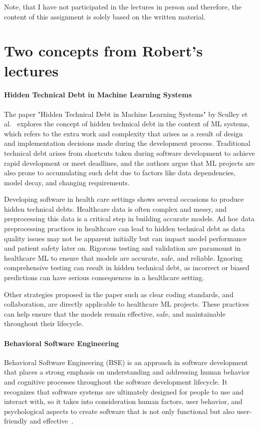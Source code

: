 \documentclass[11pt,runningheads]{article}
\begin{document}
Note, that I have not participated in the lectures in person and therefore, the content of this assignment is solely based on the written material. 

\section{Two concepts from Robert's lectures}
\paragraph{Hidden Technical Debt in Machine Learning Systems}
The paper "Hidden Technical Debt in Machine Learning Systems" by Sculley et al.~\cite{sculley2015hidden} explores the concept of hidden technical debt in the context of ML systems, which refers to the extra work and complexity that arises as a result of design and implementation decisions made during the development process. 
Traditional technical debt arises from shortcuts taken during software development to achieve rapid development or meet deadlines, and the authors argue that ML projects are also prone to accumulating such debt due to factors like data dependencies, model decay, and changing requirements. 

Developing software in health care settings shows several occasions to produce hidden technical debts. 
Healthcare data is often complex and messy, and preprocessing this data is a critical step in building accurate models. Ad hoc data preprocessing practices in healthcare can lead to hidden technical debt as data quality issues may not be apparent initially but can impact model performance and patient safety later on. Rigorous testing and validation are paramount in healthcare ML to ensure that models are accurate, safe, and reliable. Ignoring comprehensive testing can result in hidden technical debt, as incorrect or biased predictions can have serious consequences in a healthcare setting.

Other strategies proposed in the paper such as clear coding standards, and collaboration, are directly applicable to healthcare ML projects. These practices can help ensure that the models remain effective, safe, and maintainable throughout their lifecycle.

\paragraph{Behavioral Software Engineering}
Behavioral Software Engineering (BSE) is an approach in software development that places a strong emphasis on understanding and addressing human behavior and cognitive processes throughout the software development lifecycle. It recognizes that software systems are ultimately designed for people to use and interact with, so it takes into consideration human factors, user behavior, and psychological aspects to create software that is not only functional but also user-friendly and effective~\cite{sanchez2019taking}. 
\end{document}
